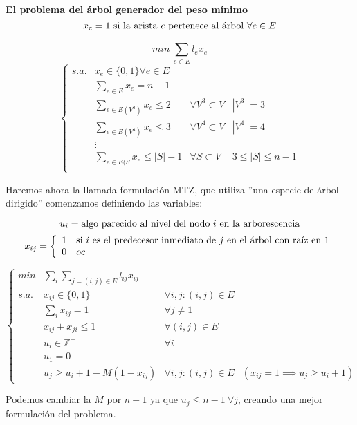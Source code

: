 \documentclass[openany]{book}
\begin{document}
\begin{exercise}
    {\color{turquoise} \textbf{El problema del árbol generador del peso mínimo} }
    $$ x_{e} = 1\ \text{si la arista $ e $ pertenece al árbol $ \forall e \in E $} $$

    $$ min\ \sum\limits_{e \in E}^{} l_{e}x_{e} $$
    $$ \left\{
    \begin{array}{llcc}
        s.a. & x_{e} \in \{0,1\} \forall e \in E & \\
        & \sum\limits_{e \in E}^{}x_{e} = n-1 & \\
        & \sum\limits_{e \in E(V ^{3})}^{} x_{e} \leq 2 & \forall V ^3 \subset V & |V^3| = 3\\
        & \sum\limits_{e \in E(V ^{4})}^{} x_{e} \leq 3 & \forall V ^4 \subset V & |V^4| = 4\\
        &  \vdots\\
        & \sum\limits_{e \in E(S}^{} x_{e} \leq |S|-1 & \forall S \subset V & 3 \leq |S| \leq n-1\\
        
    \end{array}
    \right. $$

    Haremos ahora la llamada formulación MTZ, que utiliza ''una especie de árbol dirigido'' comenzamos definiendo las variables:


    $$ u_i = \text{algo parecido al nivel del nodo $ i $ en la arborescencia} $$
    $$ x_{ij} = \left\{
    \begin{array}{ll}
        1 & \text{si $ i $ es el predecesor inmediato de $ j $ en el árbol con raíz en 1}\\
        0 & oc 
    \end{array}
    \right. $$

    $$ \left\{
    \begin{array}{llcc}
        min & \sum\limits_{i}^{}\sum\limits_{j=(i,j) \in E}^{} l_{ij}x_{ij}\\
        s.a. & x_{ij} \in \{0,1\} & \forall i,j: (i,j) \in E\\
        & \sum\limits_{i}^{}x_{ij} = 1 & \forall j \ne 1\\
        & x_{ij} + x_{ji} \leq 1 & \forall (i,j) \in E\\
        & u_i \in \mathbb{Z}^{+} & \forall i\\
        & u_1 = 0\\
        & u_j \geq u_i +1 - M (1-x_{ij}) & \forall i,j : (i,j) \in E & (x_{ij}=1 \implies u_j \geq u_i +1)

    \end{array}
    \right. $$

    Podemos cambiar la $ M $ por $ n-1 $ ya que $ u_j \leq n-1\ \forall j $, creando una mejor formulación del problema.

\end{exercise}
\end{document}
